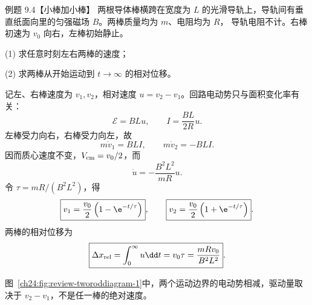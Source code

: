 \begin{origexamplebox}{例题 9.4【小棒加小棒】}
两根导体棒横跨在宽度为 $L$ 的光滑导轨上，导轨间有垂直纸面向里的匀强磁场 $B$。两棒质量均为 $m$、电阻均为 $R$，
导轨电阻不计。右棒初速为 $v_0$ 向右，左棒初始静止。

(1) 求任意时刻左右两棒的速度；

(2) 求两棒从开始运动到 $t\to\infty$ 的相对位移。

%
\begin{center}\end{center}
\label{fig:em24-question-4}
\end{origexamplebox}

\begin{xesolution}
记左、右棒速度为 $v_1,v_2$，相对速度 $u=v_2-v_1$。回路电动势只与面积变化率有关：
\begin{equation}
  \mathcal E=BLu,
  \qquad I=\frac{BL}{2R}u.
\end{equation}
左棒受力向右，右棒受力向左，故
\begin{equation}
  m\dot v_1=BLI,
  \qquad m\dot v_2=-BLI.
\end{equation}
因而质心速度不变，$V_{\rm cm}=v_0/2$，而
\begin{equation}
  \dot u=-\frac{B^2L^2}{mR}u.
\end{equation}
令 $\tau=mR/(B^2L^2)$，得
\begin{equation}
  \boxed{v_1=\frac{v_0}{2}\left(1-\e^{-t/\tau}\right)},
  \qquad
  \boxed{v_2=\frac{v_0}{2}\left(1+\e^{-t/\tau}\right)}.
\end{equation}
两棒的相对位移为
\begin{equation}
  \boxed{\Delta x_{\rm rel}=\int_0^\infty u\dd t
  =v_0\tau=\frac{mRv_0}{B^2L^2}}.
\end{equation}

图~\ref{ch24:fig:review-tworoddiagram-1}中，两个运动边界的电动势相减，驱动量取决于 $v_2-v_1$，不是任一棒的绝对速度。
\par\noindent\begin{minipage}{\linewidth}
\twoRodDiagram
{}\label{ch24:fig:review-tworoddiagram-1}
\end{minipage}\par\medskip
\end{xesolution}

